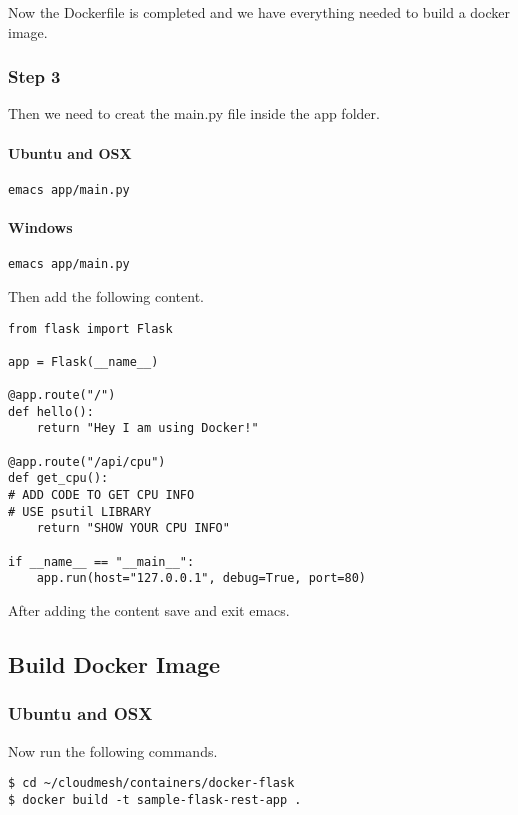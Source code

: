 Now the Dockerfile is completed and we have everything needed to build a
docker image.

\subsubsection{Step 3}

Then we need to creat the main.py file inside the app folder.

\paragraph{Ubuntu and OSX}

\begin{lstlisting}
emacs app/main.py
\end{lstlisting}

\paragraph{Windows}

\begin{lstlisting}
emacs app/main.py
\end{lstlisting}

Then add the following content.

\begin{lstlisting}
from flask import Flask

app = Flask(__name__)

@app.route("/")
def hello():
    return "Hey I am using Docker!"

@app.route("/api/cpu")
def get_cpu():
# ADD CODE TO GET CPU INFO
# USE psutil LIBRARY
    return "SHOW YOUR CPU INFO"

if __name__ == "__main__":
    app.run(host="127.0.0.1", debug=True, port=80)
\end{lstlisting}

After adding the content save and exit emacs.

\subsection{Build Docker Image}

\subsubsection{Ubuntu and OSX}

Now run the following commands.

\begin{lstlisting}
$ cd ~/cloudmesh/containers/docker-flask
$ docker build -t sample-flask-rest-app .
\end{lstlisting}

